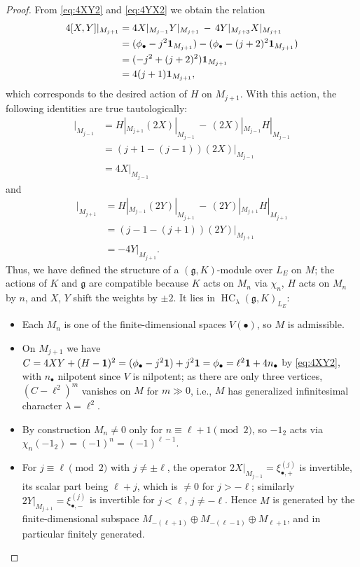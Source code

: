 \documentclass[a4paper,12pt,reqno]{amsart}
\DeclareMathOperator{\HC}{\mathrm{HC}}
\theoremstyle{plain}
\theoremstyle{remark}
\begin{document}
\begin{proof}
    From \eqref{eq:4XY2} and \eqref{eq:4YX2} we obtain the relation
    \begin{align*}
      4[X,Y]|_{M_{j+1}}
      &=4X|_{M_{j-1}}Y|_{M_{j+1}}\,-\,4Y|_{M_{j+3}}X|_{M_{j+1}}\\
      &=(\phi_\bullet-j^2{\bf1}_{M_{j+1}})-(\phi_\bullet-(j+2)^2{\bf1}_{M_{j+1}})\\
      &=(-j^2+(j+2)^2){\bf1}_{M_{j+1}}\\
      &=4(j+1){\bf1}_{M_{j+1}},
    \end{align*}
    which corresponds to the desired action of $H$ on $M_{j+1}$. With this action, the following identities are true tautologically:
    \begin{align*}
      [H,2X]|_{M_{j-1}}&=H|_{M_{j+1}}(2X)|_{M_{j-1}}\,-\,(2X)|_{M_{j-1}}H|_{M_{j-1}}\\
      &=(j+1-(j-1))(2X)|_{M_{j-1}}\\
      &=4X|_{M_{j-1}}
    \end{align*}
    and
    \begin{align*}
      [H,2Y]|_{M_{j+1}}&=H|_{M_{j-1}}(2Y)|_{M_{j+1}}\,-\,(2Y)|_{M_{j+1}}H|_{M_{j+1}}\\
      &=(j-1-(j+1))(2Y)|_{M_{j+1}}\\
      &=-4Y|_{M_{j+1}}.
    \end{align*}
    Thus, we have defined the structure of a $(\mathfrak{g}, K)$-module over $L_E$ on $M$; the actions of $K$ and $\mathfrak{g}$ are compatible because $K$ acts on $M_n$ via $\chi_n$, $H$ acts on $M_n$ by $n$, and $X$, $Y$ shift the weights by $\pm2$. It lies in $\HC_\lambda(\mathfrak{g},K)_{L_E}$:
    \begin{itemize}
      \item Each $M_n$ is one of the finite-dimensional spaces $V(\bullet)$, so $M$ is admissible.
      \item On $M_{j+1}$ we have $C=4XY+(H-{\bf1})^2=(\phi_\bullet-j^2{\bf1})+j^2{\bf1}=\phi_\bullet=\ell^2{\bf1}+4n_\bullet$ by \eqref{eq:4XY2}, with $n_\bullet$ nilpotent since $V$ is nilpotent; as there are only three vertices, $(C-\ell^2)^m$ vanishes on $M$ for $m\gg0$, i.e., $M$ has generalized infinitesimal character $\lambda=\ell^2$.
      \item By construction $M_n\neq0$ only for $n\equiv\ell+1\pmod2$, so $-1_2$ acts via $\chi_n(-1_2)=(-1)^n=(-1)^{\ell-1}$.
      \item For $j\equiv\ell\pmod2$ with $j\neq\pm\ell$, the operator $2X|_{M_{j-1}}=\xi_{\bullet,+}^{(j)}$ is invertible, its scalar part being $\ell+j$, which is $\neq0$ for $j>-\ell$; similarly $2Y|_{M_{j+1}}=\xi_{\bullet,-}^{(j)}$ is invertible for $j<\ell$, $j\neq-\ell$. Hence $M$ is generated by the finite-dimensional subspace $M_{-(\ell+1)}\oplus M_{-(\ell-1)}\oplus M_{\ell+1}$, and in particular finitely generated.
    \end{itemize}


\end{proof}
\end{document}
